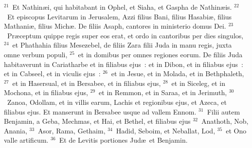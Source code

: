 ${}^{21}$~Et Nathin\ae i, qui habitabant in Ophel, et Siaha, et Gaspha de Nathin\ae is.
${}^{22}$~Et episcopus Levitarum in Jerusalem, Azzi filius Bani, filius Hasabi\ae , filius Mathani\ae , filius Mich\ae . De filiis Asaph, cantores in ministerio domus Dei.
${}^{23}$~Pr\ae ceptum quippe regis super eos erat, et ordo in cantoribus per dies singulos,
${}^{24}$~et Phathahia filius Mesezebel, de filiis Zara filii Juda in manu regis, juxta omne verbum populi,
${}^{25}$~et in domibus per omnes regiones eorum. De filiis Juda habitaverunt in Cariatharbe et in filiabus ejus~: et in Dibon, et in filiabus ejus~: et in Cabseel, et in viculis ejus~:
${}^{26}$~et in Jesue, et in Molada, et in Bethphaleth,
${}^{27}$~et in Hasersual, et in Bersabee, et in filiabus ejus,
${}^{28}$~et in Siceleg, et in Mochona, et in filiabus ejus,
${}^{29}$~et in Remmon, et in Saraa, et in Jerimuth,
${}^{30}$~Zanoa, Odollam, et in villis earum, Lachis et regionibus ejus, et Azeca, et filiabus ejus. Et manserunt in Bersabee usque ad vallem Ennom.
${}^{31}$~Filii autem Benjamin, a Geba, Mechmas, et Hai, et Bethel, et filiabus ejus 
${}^{32}$~Anathoth, Nob, Anania,
${}^{33}$~Asor, Rama, Gethaim,
${}^{34}$~Hadid, Seboim, et Neballat, Lod,
${}^{35}$~et Ono valle artificum.
${}^{36}$~Et de Levitis portiones Jud\ae\ et Benjamin.

